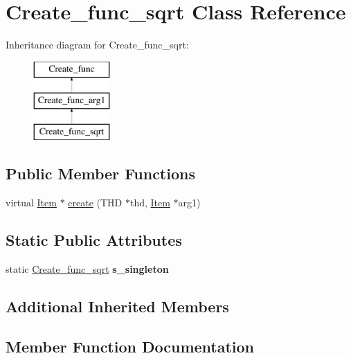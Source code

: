 \hypertarget{classCreate__func__sqrt}{}\section{Create\+\_\+func\+\_\+sqrt Class Reference}
\label{classCreate__func__sqrt}
Inheritance diagram for Create\+\_\+func\+\_\+sqrt\+:\begin{figure}[H]
\begin{center}
\leavevmode
\includegraphics[height=3.000000cm]{classCreate__func__sqrt}
\end{center}
\end{figure}
\subsection*{Public Member Functions}
\begin{DoxyCompactItemize}
\item 
virtual \mbox{\hyperlink{classItem}{Item}} $\ast$ \mbox{\hyperlink{classCreate__func__sqrt_a7f3a4ccbccaaff5cf12143bce9fc9c19}{create}} (T\+HD $\ast$thd, \mbox{\hyperlink{classItem}{Item}} $\ast$arg1)
\end{DoxyCompactItemize}
\subsection*{Static Public Attributes}
\begin{DoxyCompactItemize}
\item 
\mbox{\label{classCreate__func__sqrt_aba8006e409cfd6f4f18939725c3f81f8}} 
static \mbox{\hyperlink{classCreate__func__sqrt}{Create\+\_\+func\+\_\+sqrt}} {\bfseries s\+\_\+singleton}
\end{DoxyCompactItemize}
\subsection*{Additional Inherited Members}


\subsection{Member Function Documentation}
\mbox{\label{classCreate__func__sqrt_a7f3a4ccbccaaff5cf12143bce9fc9c19}} 
